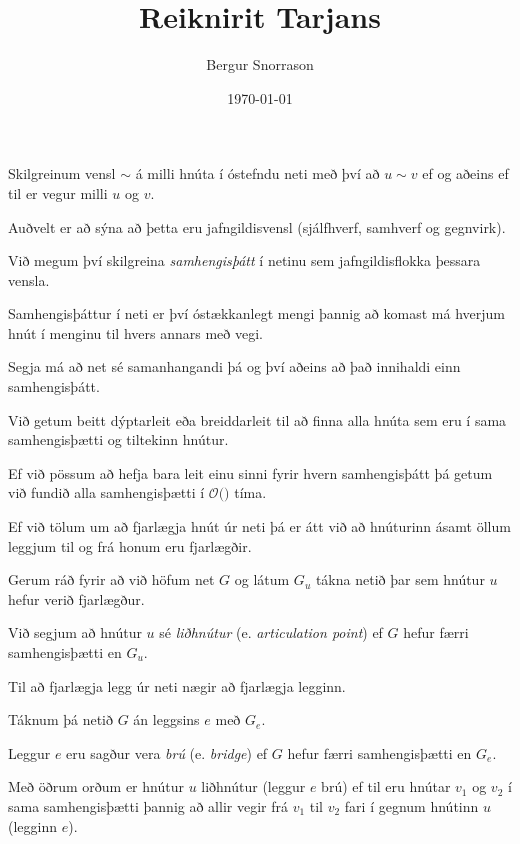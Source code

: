 \title{Reiknirit Tarjans}
\author{Bergur Snorrason}
\date{\today}



\frame{\titlepage}

{
	{
		\item<1-> Skilgreinum vensl $\sim$ á milli hnúta í óstefndu neti með því að $u \sim v$ ef og aðeins ef til er vegur milli $u$ og $v$.
		\item<2-> Auðvelt er að sýna að þetta eru jafngildisvensl (sjálfhverf, samhverf og gegnvirk).
		\item<3-> Við megum því skilgreina \emph{samhengisþátt} í netinu sem jafngildisflokka þessara vensla.
		\item<4-> Samhengisþáttur í neti er því óstækkanlegt mengi þannig að komast má hverjum hnút í menginu til hvers annars með vegi.
		\item<5-> Segja má að net sé samanhangandi þá og því aðeins að það innihaldi einn samhengisþátt.
	}
}

{
	{
		\item<1-> Við getum beitt dýptarleit eða breiddarleit til að finna alla hnúta sem eru í sama samhengisþætti og tiltekinn hnútur.
		\item<2-> Ef við pössum að hefja bara leit einu sinni fyrir hvern samhengisþátt þá getum við fundið alla samhengisþætti í
					$\mathcal{O}($\onslide<3->{$E + V$}$)$ tíma.
		\item<4->[] 
		\item<5->[] 
	}
}

{
}

{
	{
		\item<1-> Ef við tölum um að fjarlægja hnút úr neti þá er átt við að hnúturinn ásamt öllum leggjum til og frá honum eru fjarlægðir.
		\item<2-> Gerum ráð fyrir að við höfum net $G$ og látum $G_u$ tákna netið þar sem hnútur $u$ hefur verið fjarlægður.
		\item<3-> Við segjum að hnútur $u$ sé \emph{liðhnútur} (e. \emph{articulation point}) ef $G$ hefur færri samhengisþætti en $G_u$.
		\item<4-> Til að fjarlægja legg úr neti nægir að fjarlægja legginn.
		\item<5-> Táknum þá netið $G$ án leggsins $e$ með $G_e$.
		\item<6-> Leggur $e$ eru sagður vera \emph{brú} (e. \emph{bridge}) ef $G$ hefur færri samhengisþætti en $G_e$.
		\item<7-> Með öðrum orðum er hnútur $u$ liðhnútur (leggur $e$ brú) ef til eru hnútar $v_1$ og $v_2$ í sama samhengisþætti
					þannig að allir vegir frá $v_1$ til $v_2$ fari í gegnum hnútinn $u$ (legginn $e$).
	}
}

